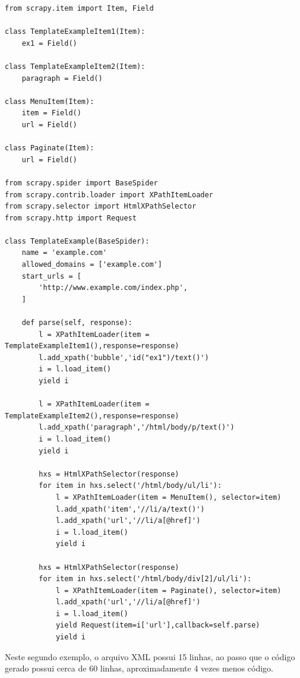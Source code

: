 \begin{lstlisting}[label=spider_python_wpt_exemplo_mais_completo]
from scrapy.item import Item, Field

class TemplateExampleItem1(Item):
    ex1 = Field()

class TemplateExampleItem2(Item):
    paragraph = Field()
    
class MenuItem(Item):
    item = Field()
    url = Field()
    
class Paginate(Item):
    url = Field()

from scrapy.spider import BaseSpider
from scrapy.contrib.loader import XPathItemLoader
from scrapy.selector import HtmlXPathSelector
from scrapy.http import Request

class TemplateExample(BaseSpider):
    name = 'example.com'
    allowed_domains = ['example.com']
    start_urls = [
        'http://www.example.com/index.php',
    ]

    def parse(self, response):
        l = XPathItemLoader(item = TemplateExampleItem1(),response=response)
        l.add_xpath('bubble','id("ex1")/text()') 
        i = l.load_item()
        yield i
        
        l = XPathItemLoader(item = TemplateExampleItem2(),response=response)
        l.add_xpath('paragraph','/html/body/p/text()') 
        i = l.load_item()
        yield i
        
        hxs = HtmlXPathSelector(response)
        for item in hxs.select('/html/body/ul/li'):
            l = XPathItemLoader(item = MenuItem(), selector=item)
            l.add_xpath('item','//li/a/text()') 
            l.add_xpath('url','//li/a[@href]') 
            i = l.load_item()
            yield i

        hxs = HtmlXPathSelector(response)
        for item in hxs.select('/html/body/div[2]/ul/li'):
            l = XPathItemLoader(item = Paginate(), selector=item)
            l.add_xpath('url','//li/a[@href]') 
            i = l.load_item()
            yield Request(item=i['url'],callback=self.parse)
            yield i
\end{lstlisting}

Neste segundo exemplo, o arquivo XML possui 15 linhas, ao passo que o código gerado possui cerca de 60 linhas, aproximadamente 4 vezes menos código.

\pagebreak
